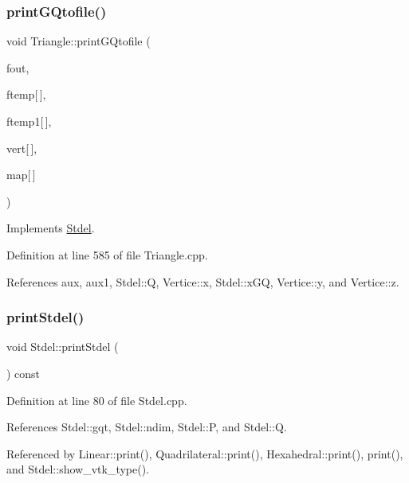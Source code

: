 \subsubsection{\texorpdfstring{print\+G\+Qtofile()}{printGQtofile()}}
{\footnotesize\ttfamily void Triangle\+::print\+G\+Qtofile (\begin{DoxyParamCaption}\item[{F\+I\+LE $\ast$}]{fout,  }\item[{const double}]{ftemp\mbox{[}$\,$\mbox{]},  }\item[{const double}]{ftemp1\mbox{[}$\,$\mbox{]},  }\item[{const \hyperlink{structVertice}{Vertice}}]{vert\mbox{[}$\,$\mbox{]},  }\item[{const int}]{map\mbox{[}$\,$\mbox{]} }\end{DoxyParamCaption})\hspace{0.3cm}{\ttfamily [virtual]}}



Implements \hyperlink{classStdel_a8196ddf2ec3c88627e33d19f93fdb354}{Stdel}.



Definition at line 585 of file Triangle.\+cpp.



References aux, aux1, Stdel\+::Q, Vertice\+::x, Stdel\+::x\+GQ, Vertice\+::y, and Vertice\+::z.

\mbox{\label{classStdel_a54b5768d09f500cb949e66fc234eac70}} 
\subsubsection{\texorpdfstring{print\+Stdel()}{printStdel()}}
{\footnotesize\ttfamily void Stdel\+::print\+Stdel (\begin{DoxyParamCaption}{ }\end{DoxyParamCaption}) const\hspace{0.3cm}{\ttfamily [inherited]}}



Definition at line 80 of file Stdel.\+cpp.



References Stdel\+::gqt, Stdel\+::ndim, Stdel\+::P, and Stdel\+::Q.



Referenced by Linear\+::print(), Quadrilateral\+::print(), Hexahedral\+::print(), print(), and Stdel\+::show\+\_\+vtk\+\_\+type().

